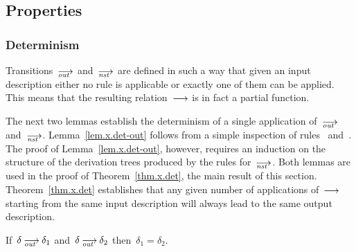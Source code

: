 

\subsection{Properties}


\subsubsection{Determinism}

Transitions~$\out$ and~$\nst$ are defined in such a way that given an input
description either no rule is applicable or exactly one of them can be
applied.  This means that the resulting relation~$\trans$ is in fact a
partial function.

The next two lemmas establish the determinism of a single application
of~$\out$ and~$\nst$.  Lemma~\ref{lem.x.det-out} follows from a simple
inspection of rules~ and~.  The proof of
Lemma~\ref{lem.x.det-out}, however, requires an induction on the structure
of the derivation trees produced by the rules for~$\nst$.  Both lemmas are
used in the proof of Theorem~\ref{thm.x.det}, the main result of this
section.  Theorem~\ref{thm.x.det} establishes that any given number of
applications of~$\trans$ starting from the same input description will
always lead to the same output description.

\begin{lemma}
  \label{lem.x.det-out}
  If~$\delta\out\delta_1$ and~$\delta\out\delta_2$ then~$\delta_1=\delta_2$.
\end{lemma}


